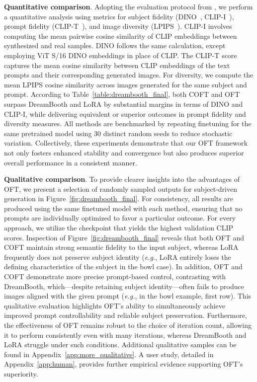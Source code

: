 \textbf{Quantitative comparison}. Adopting the evaluation protocol from \cite{ruiz2023dreambooth}, we perform a quantitative analysis using metrics for subject fidelity (DINO~\cite{caron2021emerging}, CLIP-I~\cite{radford2021learning}), prompt fidelity (CLIP-T~\cite{radford2021learning}), and image diversity (LPIPS~\cite{zhang2018unreasonable}). CLIP-I involves computing the mean pairwise cosine similarity of CLIP embeddings between synthesized and real samples. DINO follows the same calculation, except employing ViT S/16 DINO embeddings in place of CLIP. The CLIP-T score captures the mean cosine similarity between CLIP embeddings of the text prompts and their corresponding generated images. For diversity, we compute the mean LPIPS cosine similarity across images generated for the same subject and prompt. According to Table~\ref{table:dreambooth_final}, both COFT and OFT surpass DreamBooth and LoRA by substantial margins in terms of DINO and CLIP-I, while delivering equivalent or superior outcomes in prompt fidelity and diversity measures. All methods are benchmarked by repeating finetuning for the same pretrained model using 30 distinct random seeds to reduce stochastic variation. Collectively, these experiments demonstrate that our OFT framework not only fosters enhanced stability and convergence but also produces superior overall performance in a consistent manner.

\textbf{Qualitative comparison}. To provide clearer insights into the advantages of OFT, we present a selection of randomly sampled outputs for subject-driven generation in Figure~\ref{fig:dreambooth_final}. For consistency, all results are produced using the same finetuned model with each method, ensuring that no prompts are individually optimized to favor a particular outcome. For every approach, we utilize the checkpoint that yields the highest validation CLIP scores. Inspection of Figure~\ref{fig:dreambooth_final} reveals that both OFT and COFT maintain strong semantic fidelity to the input subject, whereas LoRA frequently does not preserve subject identity (\emph{e.g.}, LoRA entirely loses the defining characteristics of the subject in the bowl case). In addition, OFT and COFT demonstrate more precise prompt-based control, contrasting with DreamBooth, which—despite retaining subject identity—often fails to produce images aligned with the given prompt (\emph{e.g.}, in the bowl example, first row). This qualitative evaluation highlights OFT's ability to simultaneously achieve improved prompt controllability and reliable subject preservation. Furthermore, the effectiveness of OFT remains robust to the choice of iteration count, allowing it to perform consistently even with many iterations, whereas DreamBooth and LoRA struggle under such conditions. Additional qualitative samples can be found in Appendix~\ref{app:more_qualitative}. A user study, detailed in Appendix~\ref{app:human}, provides further empirical evidence supporting OFT's superiority.

